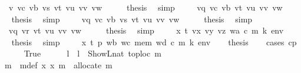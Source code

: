 \begin{isabellebody}
\ {\isacharparenleft}{\kern0pt}{}{}\ v\ vc\ vb\ vs\ vt\ vu\ vv\ vw{\isacharparenright}{\kern0pt}\isanewline
\ \ \isamarkupfalse%
\ \isamarkupfalse%
\ {\isacharquery}{\kern0pt}thesis\ \isamarkupfalse%
\ simp\isanewline
{}\isamarkupfalse%
\isanewline
\ \ \isamarkupfalse%
\ {\isacharparenleft}{\kern0pt}{}{}\ vq\ vc\ vb\ vt\ vu\ vv\ vw{\isacharparenright}{\kern0pt}\isanewline
\ \ \isamarkupfalse%
\ \isamarkupfalse%
\ {\isacharquery}{\kern0pt}thesis\ \isamarkupfalse%
\ simp\isanewline
{}\isamarkupfalse%
\isanewline
\ \ \isamarkupfalse%
\ {\isacharparenleft}{\kern0pt}{}{}\ vq\ vc\ vb\ vs\ vt\ vu\ vv\ vw{\isacharparenright}{\kern0pt}\isanewline
\ \ \isamarkupfalse%
\ \isamarkupfalse%
\ {\isacharquery}{\kern0pt}thesis\ \isamarkupfalse%
\ simp\isanewline
{}\isamarkupfalse%
\isanewline
\ \ \isamarkupfalse%
\ {\isacharparenleft}{\kern0pt}{}{}\ vq\ vr\ vt\ vu\ vv\ vw{\isacharparenright}{\kern0pt}\isanewline
\ \ \isamarkupfalse%
\ \isamarkupfalse%
\ {\isacharquery}{\kern0pt}thesis\ \isamarkupfalse%
\ simp\isanewline
{}\isamarkupfalse%
\isanewline
\ \ \isamarkupfalse%
\ {\isacharparenleft}{\kern0pt}{}{}\ x\ t\ vx\ vy\ vz\ wa\ c\ m\ k\ env{\isacharparenright}{\kern0pt}\isanewline
\ \ \isamarkupfalse%
\ \isamarkupfalse%
\ {\isacharquery}{\kern0pt}thesis\ \isamarkupfalse%
\ simp\isanewline
{}\isamarkupfalse%
\isanewline
\ \ \isamarkupfalse%
\ {\isacharparenleft}{\kern0pt}{}{}\ x\ t\ p\ wb\ wc\ mem\ wd\ c\ m\ k\ env{\isacharparenright}{\kern0pt}\isanewline
\ \ \isamarkupfalse%
\ {\isacharquery}{\kern0pt}thesis\isanewline
\ \ \isamarkupfalse%
\ {\isacharparenleft}{\kern0pt}cases\ cp{\isacharparenright}{\kern0pt}\isanewline
\ \ \ \ \isamarkupfalse%
\ True\isanewline
\ \ \ \ \isamarkupfalse%
\ l\ \ {\isachardoublequoteopen}l\ {\isacharequal}{\kern0pt}\ ShowL\isactrlsub n\isactrlsub a\isactrlsub t\ {\isacharparenleft}{\kern0pt}toploc\ m{\isacharparenright}{\kern0pt}{\isachardoublequoteclose}\isanewline
\ \ \ \ \isamarkupfalse%
\ m{\isacharprime}{\kern0pt}\ \ m{\isacharprime}{\kern0pt}{\isacharunderscore}{\kern0pt}def{\isacharcolon}{\kern0pt}\ {\isachardoublequoteopen}{\isasymexists}x{\isachardot}{\kern0pt}\ {\isacharparenleft}{\kern0pt}x{\isacharcomma}{\kern0pt}\ m{\isacharprime}{\kern0pt}{\isacharparenright}{\kern0pt}\ {\isacharequal}{\kern0pt}\ allocate\ m{\isachardoublequoteclose}\ \isamarkupfalse%

\end{isabellebody}
